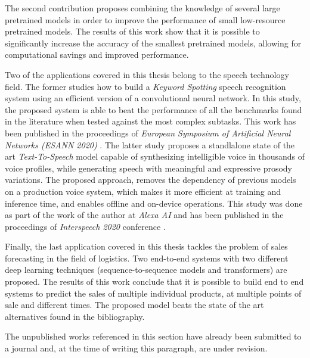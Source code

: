 The second contribution proposes combining the knowledge of several large pretrained models in order to improve the performance of small low-resource pretrained models. The results of this work show that it is possible to significantly increase the accuracy of the smallest pretrained models, allowing for computational savings and improved performance. 

Two of the applications covered in this thesis belong to the speech technology field. The former studies how to build a \textit{Keyword Spotting} speech recognition system using an efficient version of a convolutional neural network. In this study, the proposed system is able to beat the performance of all the benchmarks found in the literature when tested against the most complex subtasks. This work has been published in the proceedings of \textit{European Symposium of Artificial Neural Networks (ESANN 2020)} \cite{valles2021a}. The latter study proposes a standlalone state of the art \textit{Text-To-Speech} model capable of synthesizing intelligible voice in thousands of voice profiles, while generating speech with meaningful and expressive prosody variations. The proposed approach, removes the dependency of previous models on a production voice system, which makes it more efficient at training and inference time, and enables offline and on-device operations. This study was done as part of the work of the author at \textit{Alexa AI} and has been published in the proceedings of \textit{Interspeech 2020} conference \cite{valles2021b}.

Finally, the last application covered in this thesis tackles the problem of sales forecasting in the field of logistics. Two end-to-end systems with two different deep learning techniques (sequence-to-sequence models and transformers) are proposed. The results of this work conclude that it is possible to build end to end systems to predict the sales of multiple individual products, at multiple points of sale and different times. The proposed model beats the state of the art alternatives found in the bibliography. 

The unpublished works referenced in this section have already been submitted to a journal and, at the time of writing this paragraph, are under revision.

